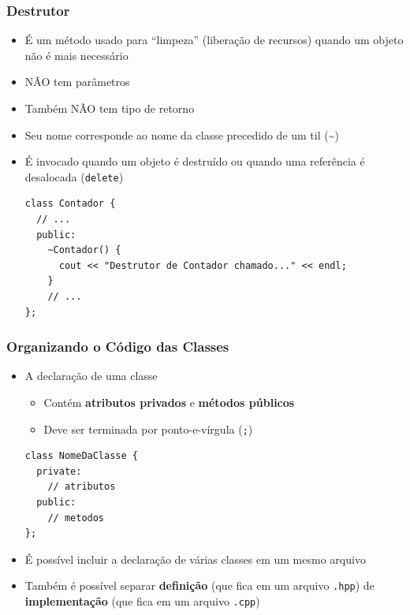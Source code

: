 \documentclass[aspectratio=169]{beamer}
\begin{document}
\begin{frame}[fragile]\frametitle{Destrutor}
\begin{itemize}
	\item É um método usado para ``limpeza'' (liberação de recursos) quando um objeto não é mais necessário
	\item NÃO tem parâmetros
	\item Também NÃO tem tipo de retorno
	\item Seu nome corresponde ao nome da classe precedido de um til (\textasciitilde)
	\item É invocado quando um objeto é destruído ou quando uma referência é desalocada (\texttt{delete})
\begin{lstlisting}[basicstyle=\ttfamily\footnotesize]
class Contador {
  // ...
  public:
    ~Contador() {
      cout << "Destrutor de Contador chamado..." << endl;
    }
    // ...
};
\end{lstlisting}
\end{itemize}
\end{frame}

\begin{frame}[fragile]\frametitle{Organizando o Código das Classes}
\begin{itemize}
	\item A declaração de uma classe
	\begin{itemize}
		\item Contém \textbf{atributos privados} e \textbf{métodos públicos}
		\item Deve ser terminada por ponto-e-vírgula (\texttt{;})
	\end{itemize}
\begin{lstlisting}[basicstyle=\ttfamily\footnotesize]
class NomeDaClasse {
  private:
    // atributos
  public:
    // metodos
};        
\end{lstlisting}
	\item É possível incluir a declaração de várias classes em um mesmo arquivo
	\item Também é possível separar \textbf{definição} (que fica em um arquivo \texttt{.hpp}) de \textbf{implementação} (que fica em um arquivo \texttt{.cpp})
\end{itemize}
\end{frame}
\end{document}
